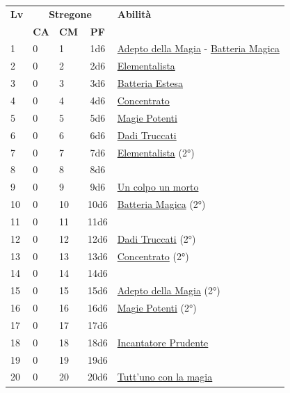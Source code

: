 {\begin{multicols}{2}


\noindent\begin{tabularx}{\linewidth}{p{0.3cm}|p{0.3cm}p{0.3cm}c|X|}
	\toprule
 \rowcolor{gray!20}	\textbf{Lv} & \multicolumn{3}{c|}{\textbf{Stregone}} & \textbf{Abilità} \\
& \centering\arraybackslash \textbf{CA} & \centering\arraybackslash \textbf{CM} & \centering\arraybackslash \textbf{PF} & \\
	\toprule
	1 &0	& 1	&	1d6	&\hyperlink{Adepto della Magia}{Adepto della Magia} - \hyperlink{Batteria Magica}{Batteria Magica}\\
 \rowcolor{gray!20}2	&	0	& 2	&	2d6	&\hyperlink{Elementalista}{Elementalista}\\
	3	&	0	& 3	&	3d6	&\hyperlink{Batteria Estesa}{Batteria Estesa}\\
 \rowcolor{gray!20}4	&	0	& 4	&	4d6	&\hyperlink{Concentrato}{Concentrato}\\
	5	&	0	& 5	&	5d6	&\hyperlink{Magie Potenti}{Magie Potenti}\\
 \rowcolor{gray!20}6	&	0	& 6	&	6d6	&\hyperlink{Dadi Truccati}{Dadi Truccati}\\
	7	&	0	& 7	&	7d6	&\hyperlink{Elementalista}{Elementalista} (2°)\\
 \rowcolor{gray!20}8	&	0	& 8	&	8d6	&\\
	9	&	0	& 9	&	9d6	&\hyperlink{Un colpo un morto}{Un colpo un morto}\\
 \rowcolor{gray!20}10	&	0	& 10	&	10d6	&\hyperlink{Batteria Magica}{Batteria Magica} (2°)\\
	11	&	0	& 11	&	11d6	&\\
 \rowcolor{gray!20}12	&	0	& 12	&	12d6	&\hyperlink{Dadi Truccati}{Dadi Truccati} (2°)\\
	13	&	0	& 13	&	13d6	&\hyperlink{Concentrato}{Concentrato} (2°)\\
 \rowcolor{gray!20}14	&	0	& 14	&	14d6	&\\
	15	&	0	& 15	&	15d6	&\hyperlink{Adepto della Magia}{Adepto della Magia} (2°)\\
 \rowcolor{gray!20}16	&	0	& 16	&	16d6	&\hyperlink{Magie Potenti}{Magie Potenti} (2°)\\
	17	&	0	& 17	&	17d6	&\\
 \rowcolor{gray!20}18	&	0	& 18	&	18d6	&\hyperlink{Incantatore Prudente}{Incantatore Prudente}\\
	19	&	0	& 19	&	19d6	&\\
 \rowcolor{gray!20}20	&	0	& 20	&	20d6	&\hyperlink{Tutt'uno con la magia}{Tutt'uno con la magia}\\
\end{tabularx}


\end{multicols}}
